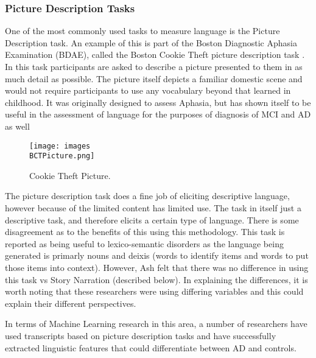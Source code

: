 \documentclass[12pt, twoside, a4paper]{article}
\begin{document}
\subsubsection{Picture Description Tasks}
One of the most commonly used tasks to measure language is the Picture Description task. An example of this is part of the Boston Diagnostic Aphasia Examination (BDAE), called the Boston Cookie Theft picture description task \cite{Kaplan2010}. In this task participants are asked to describe a picture presented to them in as much detail as possible. The picture itself depicts a familiar domestic scene and would not require participants to use any vocabulary beyond that learned in childhood. It was originally designed to assess Aphasia, but has shown itself to be useful in the assessment of language for the purposes of diagnosis of MCI and AD as well \cite{Giles1996}
\begin{figure}[H]
\centering
\texttt{[image: images\\BCTPicture.png]}
\caption{Cookie Theft Picture.\label{white}}
\end{figure}
\par
The picture description task does a fine job of eliciting descriptive language, however because of the limited content has limited use. The task in itself just a descriptive task, and therefore elicits a certain type of language. There is some disagreement as to the benefits of this using this methodology. This task is reported as being useful to lexico-semantic disorders \cite{Boschi2017, Sajjadi2012} as the language being generated is primarly nouns and deixis (words to identify items and words to put those items into context). However, Ash \cite{Ash2012}felt that there was no difference in using this task vs Story Narration (described below). In explaining the differences, it is worth noting that these researchers were using differing variables and this could explain their different perspectives.
\par
In terms of Machine Learning research in this area, a number of researchers have used transcripts based on picture description tasks \cite{Zimmerer2016, Orimaye2017, Mueller2018a, Fraser2015} and have successfully extracted linguistic features that could differentiate between AD and controls.
\par
\end{document}
